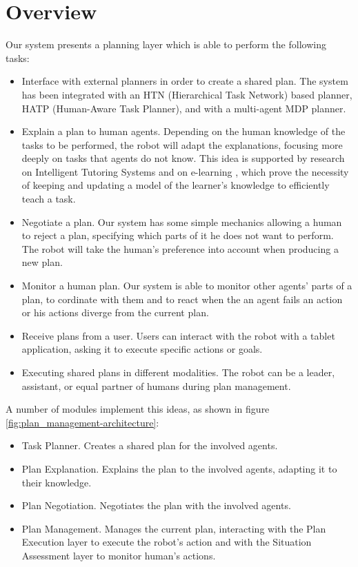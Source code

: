\section{Overview}
\label{sec:plan_management-overview}
Our system presents a planning layer which is able to perform the following tasks:
\begin{itemize}
	\item Interface with external planners in order to create a shared plan. The system has been integrated with an HTN (Hierarchical Task Network) based planner, HATP (Human-Aware Task Planner), and with a multi-agent MDP planner.
	\item Explain a plan to human agents. Depending on the human knowledge of the tasks to be performed, the robot will adapt the explanations, focusing more deeply on tasks that agents do not know. This idea is supported by research on Intelligent Tutoring Systems \cite{brusilovskiy1994construction}  and on e-learning \cite{brusilovskiy2005}, which  prove the necessity of keeping and updating a model of the learner's knowledge to efficiently teach a task.
	\item Negotiate a plan. Our system has some simple mechanics allowing a human to reject a plan, specifying which parts of it he does not want to perform. The robot will take the human's preference into account when producing a new plan.
	\item Monitor a human plan. Our system is able to monitor other agents' parts of a plan, to cordinate with them and to react when the an agent fails an action or his actions diverge from the current plan.
	\item Receive plans from a user. Users can interact with the robot with a tablet application, asking it to execute specific actions or goals.
	\item Executing shared plans in different modalities. The robot can be a leader, assistant, or equal partner of humans during plan management.
\end{itemize}

A number of modules implement this ideas, as shown in figure \ref{fig:plan_management-architecture}:
\begin{itemize}
\item Task Planner. Creates a shared plan for the involved agents.
\item Plan Explanation. Explains the plan to the involved agents, adapting it to their knowledge.
\item Plan Negotiation. Negotiates the plan with the involved agents.
\item Plan Management. Manages the current plan, interacting with the Plan Execution layer to execute the robot's action and with the Situation Assessment layer to monitor human's actions.
\end{itemize}

